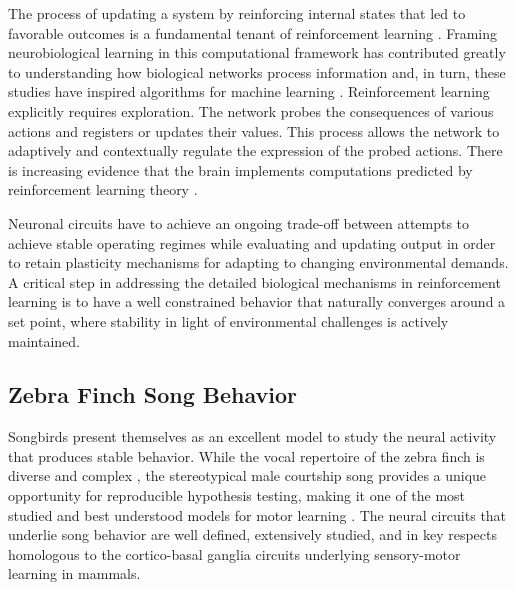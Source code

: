 The process of updating a system by reinforcing internal states that led to favorable outcomes is a fundamental tenant of reinforcement learning \cite{Kaelbling1996-op} \cite{Andrew1998-kn} \cite{Sutton1998-bp}. Framing neurobiological learning in this computational framework has contributed greatly to understanding how biological networks process information \cite{Niv2009-qd}  and, in turn, these studies have inspired algorithms for machine learning \cite{Sutton1998-bp}. Reinforcement learning explicitly requires exploration. The network probes the consequences of various actions and registers or updates their values. This process allows the network to adaptively and contextually regulate the expression of the probed actions. There is increasing evidence that the brain implements computations predicted by reinforcement learning theory \cite{Daw2006-jd}  \cite{Niv2009-qd} \cite{Eshel2015-qd}  \cite{Schultz1997-vh}.
 
Neuronal circuits have to achieve an ongoing trade-off between attempts to achieve stable operating regimes while evaluating and updating output in order to retain plasticity mechanisms for adapting to changing environmental demands. A critical step in addressing the detailed biological mechanisms in reinforcement learning is to have a well constrained behavior that naturally converges around a set point, where stability in light of environmental challenges is actively maintained. 

\subsection{Zebra Finch Song Behavior}


Songbirds present themselves as an excellent model to study the neural activity that produces stable behavior. While the vocal repertoire of the zebra finch is diverse and complex \cite{Woolley2005-of}, the stereotypical male courtship song provides a unique opportunity for reproducible hypothesis testing, making it one of  the most studied and best understood models for motor learning \cite{Williams2004-hn}. The neural circuits that underlie song behavior are well defined, extensively studied, and in key respects homologous to the cortico-basal ganglia circuits underlying sensory-motor learning in mammals. 


